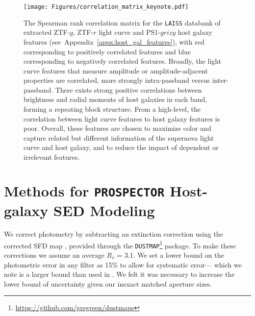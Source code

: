 \documentclass[twocolumn]{aastex63}
\newcommand{\laiss}{\texttt{LAISS}}
\begin{document}
\begin{figure}
    \centering
    \texttt{[image: Figures/correlation\_matrix\_keynote.pdf]}
    \caption{
    The Spearman rank correlation matrix for the \laiss{} databank of extracted ZTF-$g$, ZTF-$r$ light curve and PS1-$grizy$ host galaxy features (see~Appendix~\ref{appx:host_gal_features}), with red corresponding to positively correlated features and blue corresponding to negatively correlated features. Broadly, the light curve features that measure amplitude or amplitude-adjacent properties are correlated, more strongly intra-passband versus inter-passband. There exists strong positive correlations between brightness and radial moments of host galaxies in each band, forming a repeating block structure. From a high-level, the correlation between light curve features to host galaxy features is poor. Overall, these features are chosen to maximize color and capture related but different information of the supernova light curve and host galaxy, and to reduce the impact of dependent or irrelevant features.
    } 
    \label{fig:120d_corr}
\end{figure}


\section{Methods for \texttt{PROSPECTOR} Host-galaxy SED Modeling}
\label{subsec:APP_SED_Prospector}

\renewcommand{\thefigure}{D.\arabic{figure}}
\setcounter{figure}{0}
\renewcommand{\thetable}{D.\arabic{table}} \setcounter{table}{0}


We correct photometry by subtracting an extinction correction using the corrected SFD map \citep{CSFDDustmapChiang2023}, provided through the \texttt{DUSTMAP}\footnote{\url{https://github.com/gregreen/dustmaps}} package. To make these corrections we assume an average $R_{v}$ = 3.1. We set a lower bound on the photometric error in any filter as 15\% to allow for systematic error--- which we note is a larger bound than used in \cite{Leja_2019}. We felt it was necessary to increase the lower bound of uncertainty given our inexact matched aperture sizes. %
\end{document}
